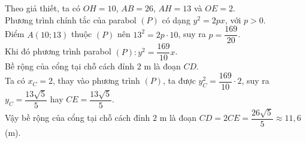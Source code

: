 \begin{vd}
{\begin{center}
		\end{center}
		Theo giả thiết, ta có $OH=10$, $AB=26$, $AH=13$ và $OE=2$.\\
		Phương trình chính tắc của parabol $(P)$ có dạng $y^2=2px$, với $p>0$.\\
		Điểm $A(10;13)$ thuộc $(P)$ nên $13^2=2p\cdot 10$, suy ra $p=\dfrac{169}{20}$.\\
		Khi đó phương trình parabol $(P)\colon y^2=\dfrac{169}{10}x$.\\
		Bề rộng của cổng tại chỗ cách đỉnh $2$ m là đoạn $CD$.\\
		Ta có $x_C=2$, thay vào phương trình $(P)$, ta được $y_C^2=\dfrac{169}{10}\cdot 2$, suy ra $y_C=\dfrac{13\sqrt{5}}{5}$ hay $CE=\dfrac{13\sqrt{5}}{5}$.\\
		Vậy bề rộng của cổng tại chỗ cách đỉnh $2$ m là đoạn $CD=2CE=\dfrac{26\sqrt{5}}{5}\approx 11{,}6$ (m).
	}
\end{vd}
